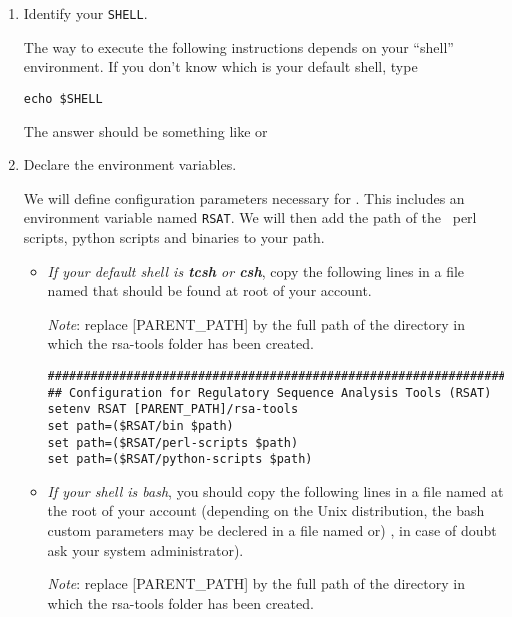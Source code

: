 \begin{enumerate}

\item Identify your \texttt{SHELL}.

  The way to execute the following instructions depends on your
  ``shell'' environment. If you don't know which is your default
  shell, type

\lstset{language=csh}

\begin{lstlisting}
echo $SHELL
\end{lstlisting}

The answer should be something like  or

\item Declare the \RSAT environment variables.

  We will define configuration parameters necessary for \RSAT.  This
  includes an environment variable named \texttt{RSAT}.  We will then
  add the path of the \RSAT \ perl scripts, python scripts and
  binaries to your path.

\begin{itemize}

\item \emph{If your default shell is \textbf{tcsh} or \textbf{csh}},
  copy the following lines in a file named  that should
  be found at root of your account.

  \emph{Note}: replace [PARENT\_PATH] by the full path of the directory
  in which the rsa-tools folder has been created.

\begin{lstlisting}
################################################################
## Configuration for Regulatory Sequence Analysis Tools (RSAT)
setenv RSAT [PARENT_PATH]/rsa-tools
set path=($RSAT/bin $path)
set path=($RSAT/perl-scripts $path)
set path=($RSAT/python-scripts $path)
\end{lstlisting}

\item \emph{If your shell is bash}, you should copy the following
  lines in a file named  at the root of your
  account (depending on the Unix distribution, the bash custom
  parameters may be declered in a file named  or)
  , in case of doubt ask your system administrator).

  \emph{Note}: replace [PARENT\_PATH] by the full path of the directory
  in which the rsa-tools folder has been created.


\end{itemize}
\end{enumerate}
